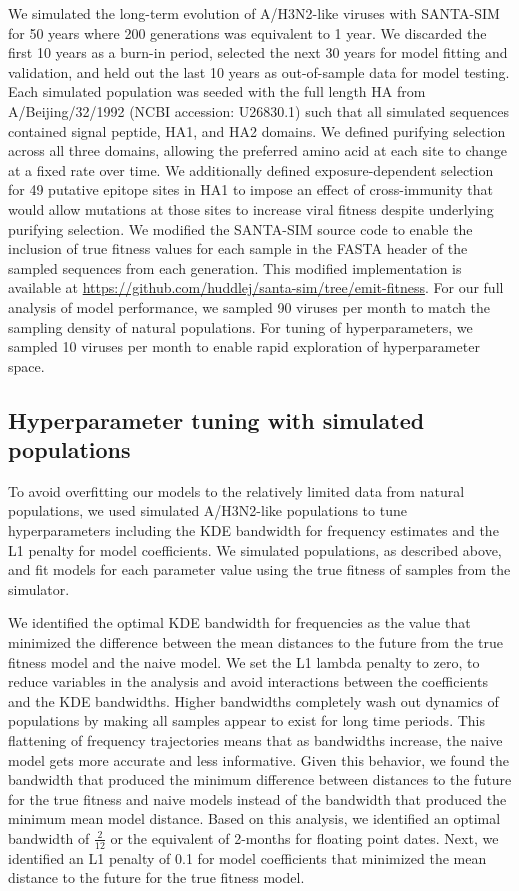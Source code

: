 We simulated the long-term evolution of A/H3N2-like viruses with SANTA-SIM \cite{Jariani2019} for 50 years where 200 generations was equivalent to 1 year.
We discarded the first 10 years as a burn-in period, selected the next 30 years for model fitting and validation, and held out the last 10 years as out-of-sample data for model testing.
Each simulated population was seeded with the full length HA from A/Beijing/32/1992 (NCBI accession: U26830.1) such that all simulated sequences contained signal peptide, HA1, and HA2 domains.
We defined purifying selection across all three domains, allowing the preferred amino acid at each site to change at a fixed rate over time.
We additionally defined exposure-dependent selection for 49 putative epitope sites in HA1 \cite{Luksza:2014hj} to impose an effect of cross-immunity that would allow mutations at those sites to increase viral fitness despite underlying purifying selection.
We modified the SANTA-SIM source code to enable the inclusion of true fitness values for each sample in the FASTA header of the sampled sequences from each generation.
This modified implementation is available at \url{https://github.com/huddlej/santa-sim/tree/emit-fitness}.
For our full analysis of model performance, we sampled 90 viruses per month to match the sampling density of natural populations.
For tuning of hyperparameters, we sampled 10 viruses per month to enable rapid exploration of hyperparameter space.

\subsection*{Hyperparameter tuning with simulated populations}

To avoid overfitting our models to the relatively limited data from natural populations, we used simulated A/H3N2-like populations to tune hyperparameters including the KDE bandwidth for frequency estimates and the L1 penalty for model coefficients.
We simulated populations, as described above, and fit models for each parameter value using the true fitness of samples from the simulator.

We identified the optimal KDE bandwidth for frequencies as the value that minimized the difference between the mean distances to the future from the true fitness model and the naive model.
We set the L1 lambda penalty to zero, to reduce variables in the analysis and avoid interactions between the coefficients and the KDE bandwidths.
Higher bandwidths completely wash out dynamics of populations by making all samples appear to exist for long time periods.
This flattening of frequency trajectories means that as bandwidths increase, the naive model gets more accurate and less informative.
Given this behavior, we found the bandwidth that produced the minimum difference between distances to the future for the true fitness and naive models instead of the bandwidth that produced the minimum mean model distance.
Based on this analysis, we identified an optimal bandwidth of $\frac{2}{12}$ or the equivalent of 2-months for floating point dates.
Next, we identified an L1 penalty of 0.1 for model coefficients that minimized the mean distance to the future for the true fitness model.

